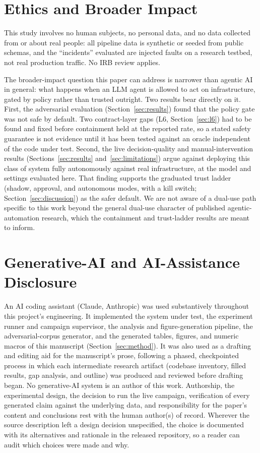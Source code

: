 \section*{Ethics and Broader Impact}

This study involves no human subjects, no personal data, and no data collected from or about real
people: all pipeline data is synthetic or seeded from public schemas, and the ``incidents''
evaluated are injected faults on a research testbed, not real production traffic. No IRB review
applies.

The broader-impact question this paper can address is narrower than agentic AI in general: what
happens when an LLM agent is allowed to act on infrastructure, gated by policy rather than trusted
outright. Two results bear directly on it. First, the adversarial evaluation
(Section~\ref{sec:results}) found that the policy gate was not safe by default. Two contract-layer
gaps (L6, Section~\ref{sec:l6}) had to be found and fixed before containment held at the
reported rate, so a stated safety guarantee is not evidence until it has been tested against an
oracle independent of the code under test. Second, the live decision-quality and
manual-intervention results (Sections~\ref{sec:results} and~\ref{sec:limitations}) argue against
deploying this class of system fully autonomously against real infrastructure, at the model and
settings evaluated here. That finding supports the graduated trust ladder (shadow, approval, and
autonomous modes, with a kill switch; Section~\ref{sec:discussion}) as the safer default. We are not
aware of a dual-use path specific to this work beyond the general dual-use character of published
agentic-automation research, which the containment and trust-ladder results are meant to inform.

\section*{Generative-AI and AI-Assistance Disclosure}

An AI coding assistant (Claude, Anthropic) was used substantively throughout this project's
engineering. It implemented the system under test, the experiment runner and campaign supervisor,
the analysis and figure-generation pipeline, the adversarial-corpus generator, and the generated
tables, figures, and numeric macros of this manuscript (Section~\ref{sec:method}). It was also used
as a drafting and editing aid for the manuscript's prose, following a phased, checkpointed process in
which each intermediate research artifact (codebase inventory, filled results, gap analysis, and
outline) was produced and reviewed before drafting began. No generative-AI system is an author of
this work. Authorship, the experimental design, the decision to run the live campaign, verification
of every generated claim against the underlying data, and
responsibility for the paper's content and conclusions rest with the human author(s) of record.
Wherever the source description left a design decision unspecified, the choice is documented with its alternatives and rationale in the released repository, so a reader can audit which choices were made and why.
